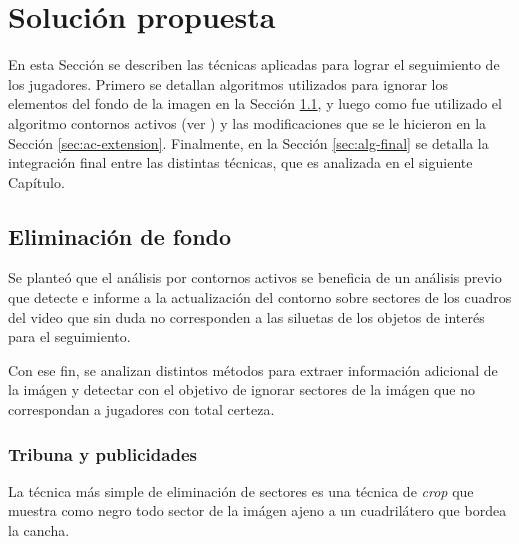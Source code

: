 \chapter{Solución propuesta}
\label{chap-solution}

En esta Sección se describen las técnicas aplicadas para lograr el seguimiento
de los jugadores. Primero se detallan algoritmos utilizados para ignorar los
elementos del fondo de la imagen en la Sección
\ref{sec:background-elimination}, y luego como fue utilizado el algoritmo
contornos activos (ver \cite{fast-level-set}) y las modificaciones que se le
hicieron en la Sección \ref{sec:ac-extension}. Finalmente, en la Sección
\ref{sec:alg-final} se detalla la integración final entre las distintas
técnicas, que es analizada en el siguiente Capítulo.

\section{Eliminación de fondo}

\label{sec:background-elimination}
Se planteó que el análisis por contornos activos se beneficia de un análisis
previo que detecte e informe a la actualización del contorno sobre sectores de
los cuadros del video que sin duda no corresponden a las siluetas de los
objetos de interés para el seguimiento.

Con ese fin, se analizan distintos métodos para extraer información adicional
de la imágen y detectar con el objetivo de ignorar sectores de la imágen que
no correspondan a jugadores con total certeza.

\subsection{Tribuna y publicidades}

La técnica más simple de eliminación de sectores es una técnica de
\textit{crop} que muestra como negro todo sector de la imágen ajeno a un
cuadrilátero que bordea la cancha.

